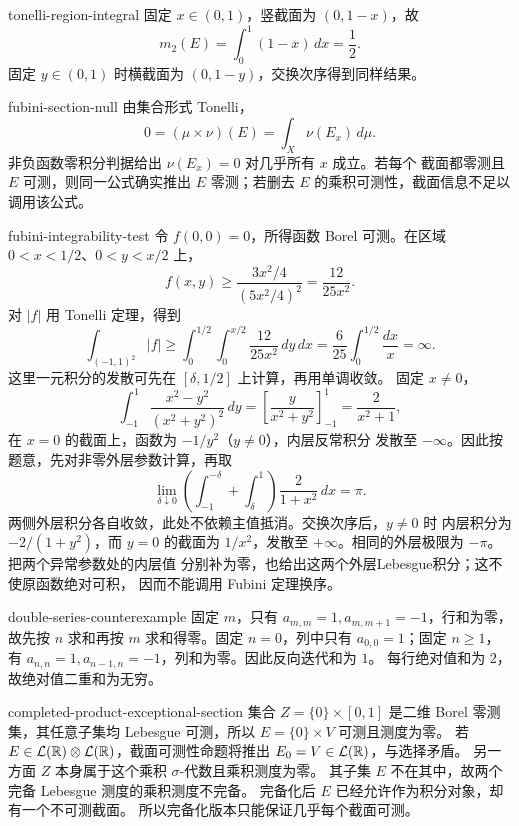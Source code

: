 \begin{solution}{tonelli-region-integral}
固定 \(x\in(0,1)\)，竖截面为 \((0,1-x)\)，故
\[
 m_2(E)=\int_0^1(1-x)\,dx=\frac12.
\]
固定 \(y\in(0,1)\) 时横截面为 \((0,1-y)\)，交换次序得到同样结果。
\end{solution}

\begin{solution}{fubini-section-null}
由集合形式 Tonelli，
\[
 0=(\mu\times\nu)(E)=\int_X\nu(E_x)\,d\mu.
\]
非负函数零积分判据给出 \(\nu(E_x)=0\) 对几乎所有 \(x\) 成立。若每个
截面都零测且 \(E\) 可测，则同一公式确实推出 \(E\) 零测；若删去
\(E\) 的乘积可测性，截面信息不足以调用该公式。
\end{solution}

\begin{solution}{fubini-integrability-test}
令 \(f(0,0)=0\)，所得函数 Borel 可测。在区域
\(0<x<1/2\)、\(0<y<x/2\) 上，
\[
 f(x,y)\geq\frac{3x^2/4}{(5x^2/4)^2}
 =\frac{12}{25x^2}.
\]
对 \(|f|\) 用 Tonelli 定理，得到
\[
 \int_{(-1,1)^2}|f|\geq
 \int_0^{1/2}\int_0^{x/2}\frac{12}{25x^2}\,dy\,dx
 =\frac6{25}\int_0^{1/2}\frac{dx}{x}=\infty.
\]
这里一元积分的发散可先在 \([\delta,1/2]\) 上计算，再用单调收敛。
固定 \(x\ne0\)，
\[
 \int_{-1}^{1}\frac{x^2-y^2}{(x^2+y^2)^2}\,dy
 =\left[\frac{y}{x^2+y^2}\right]_{-1}^{1}
 =\frac{2}{x^2+1},
\]
在 \(x=0\) 的截面上，函数为 \(-1/y^2\)（\(y\ne0\)），内层反常积分
发散至 \(-\infty\)。因此按题意，先对非零外层参数计算，再取
\[
 \lim_{\delta\downarrow0}\left(\int_{-1}^{-\delta}
 +\int_\delta^1\right)\frac2{1+x^2}\,dx=\pi.
\]
两侧外层积分各自收敛，此处不依赖主值抵消。交换次序后，\(y\ne0\) 时
内层积分为 \(-2/(1+y^2)\)，而 \(y=0\) 的截面为 \(1/x^2\)，发散至
\(+\infty\)。相同的外层极限为 \(-\pi\)。把两个异常参数处的内层值
分别补为零，也给出这两个外层Lebesgue积分；这不使原函数绝对可积，
因而不能调用 Fubini 定理换序。
\end{solution}

\begin{solution}{double-series-counterexample}
固定 \(m\)，只有 \(a_{m,m}=1,a_{m,m+1}=-1\)，行和为零，故先按
\(n\) 求和再按 \(m\) 求和得零。固定 \(n=0\)，列中只有
\(a_{0,0}=1\)；固定 \(n\ge1\)，有
\(a_{n,n}=1,a_{n-1,n}=-1\)，列和为零。因此反向迭代和为 \(1\)。
每行绝对值和为 \(2\)，故绝对值二重和为无穷。
\end{solution}

\begin{solution}{completed-product-exceptional-section}
集合 \(Z=\{0\}\times[0,1]\) 是二维 Borel 零测集，其任意子集均
Lebesgue 可测，所以 \(E=\{0\}\times V\) 可测且测度为零。
若 \(E\in\mathcal L(\mathbb{R})\otimes\mathcal L(\mathbb{R})\)，截面可测性命题将推出
\(E_0=V\in\mathcal L(\mathbb{R})\)，与选择矛盾。
另一方面 \(Z\) 本身属于这个乘积 \(\sigma\)-代数且乘积测度为零。
其子集 \(E\) 不在其中，故两个完备 Lebesgue 测度的乘积测度不完备。
完备化后 \(E\) 已经允许作为积分对象，却有一个不可测截面。
所以完备化版本只能保证几乎每个截面可测。
\end{solution}

